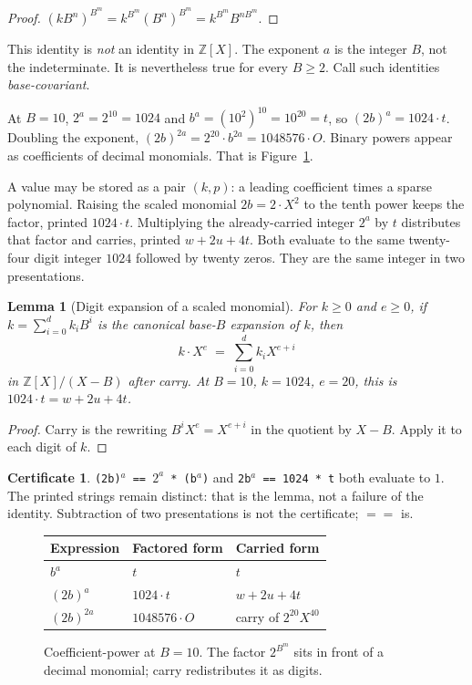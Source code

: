 \documentclass{article}
\newcommand{\ZZ}{\mathbb{Z}}
\newcommand{\eqc}{\mathrel{\mathtt{==}}}
\theoremstyle{plain}
\newtheorem*{lemma*}{Lemma}
\theoremstyle{definition}
\newtheorem*{certificate}{Certificate}
\theoremstyle{remark}
\begin{document}
\begin{proof}
\((k B^n)^{B^m} = k^{B^m} (B^n)^{B^m} = k^{B^m} B^{n B^m}\).
\end{proof}

This identity is \emph{not} an identity in \(\ZZ[X]\). The exponent \(a\)
is the integer \(B\), not the indeterminate. It is nevertheless true for
every \(B \ge 2\). Call such identities \emph{base-covariant}.

At \(B=10\), \(2^a = 2^{10} = 1024\) and
\(b^a = (10^2)^{10} = 10^{20} = t\), so \((2b)^a = 1024 \cdot t\).
Doubling the exponent,
\((2b)^{2a} = 2^{20} \cdot b^{2a} = 1048576 \cdot O\). Binary powers
appear as coefficients of decimal monomials. That is
Figure~\ref{fig:coeff}.

A value may be stored as a pair \((k,p)\): a leading coefficient times a
sparse polynomial. Raising the scaled monomial \(2b = 2\cdot X^2\) to the
tenth power keeps the factor, printed \(1024\cdot t\). Multiplying the
already-carried integer \(2^a\) by \(t\) distributes that factor and
carries, printed \(w + 2u + 4t\). Both evaluate to the same twenty-four
digit integer \(1024\) followed by twenty zeros. They are the same integer
in two presentations.

\begin{lemma*}[Digit expansion of a scaled monomial]
For \(k \ge 0\) and \(e \ge 0\), if \(k = \sum_{i=0}^d k_i B^i\) is the
canonical base-\(B\) expansion of \(k\), then
\[
k \cdot X^e \;=\; \sum_{i=0}^d k_i X^{e+i}
\]
in \(\ZZ[X]/(X-B)\) after carry. At \(B=10\), \(k=1024\), \(e=20\), this
is \(1024\cdot t = w + 2u + 4t\).
\end{lemma*}

\begin{proof}
Carry is the rewriting \(B^i X^e = X^{e+i}\) in the quotient by \(X-B\).
Apply it to each digit of \(k\).
\end{proof}

\begin{certificate}
\texttt{(2b)$^a$ == $2^a$ * (b$^a$)} and
\texttt{2b$^a$ == 1024 * t} both evaluate to \(1\). The printed
strings remain distinct: that is the lemma, not a failure of the identity.
Subtraction of two presentations is not the certificate; \(\eqc\) is.
\end{certificate}

\begin{figure}[htbp]
\centering
\begin{tabular}{lll}
Expression & Factored form & Carried form \\
\hline
\(b^a\) & \(t\) & \(t\) \\
\((2b)^a\) & \(1024\cdot t\) & \(w+2u+4t\) \\
\((2b)^{2a}\) & \(1048576\cdot O\) & carry of \(2^{20}X^{40}\) \\
\end{tabular}
\caption{Coefficient-power at \(B=10\). The factor \(2^{B^m}\) sits in
front of a decimal monomial; carry redistributes it as digits.}
\label{fig:coeff}
\end{figure}
\end{document}
